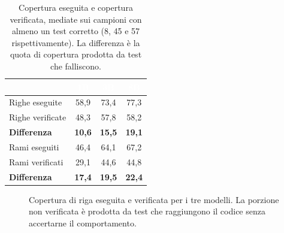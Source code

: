 \begin{table}[H]
\centering
\caption{Copertura eseguita e copertura verificata, mediate sui campioni con
almeno un test corretto (8, 45 e 57 rispettivamente). La differenza è la quota
di copertura prodotta da test che falliscono.}
\label{tab:verificata}
\begin{tabular}{lccc}
\hline
\rowcolor{intest}
& \textcolor{white}{\textbf{1B}} & \textcolor{white}{\textbf{3B}} &
\textcolor{white}{\textbf{8B}} \\
\hline
Righe eseguite    & 58,9 & 73,4 & 77,3 \\
Righe verificate  & 48,3 & 57,8 & 58,2 \\
\rowcolor{accento}
\textbf{Differenza} & \textbf{10,6} & \textbf{15,5} & \textbf{19,1} \\
\hline
Rami eseguiti     & 46,4 & 64,1 & 67,2 \\
Rami verificati   & 29,1 & 44,6 & 44,8 \\
\rowcolor{accento}
\textbf{Differenza} & \textbf{17,4} & \textbf{19,5} & \textbf{22,4} \\
\hline
\end{tabular}
\end{table}

\begin{figure}[H]
\centering
{}
\caption{Copertura di riga eseguita e verificata per i tre modelli. La porzione
non verificata è prodotta da test che raggiungono il codice senza accertarne il
comportamento.}
\label{fig:verificata}
\end{figure}

